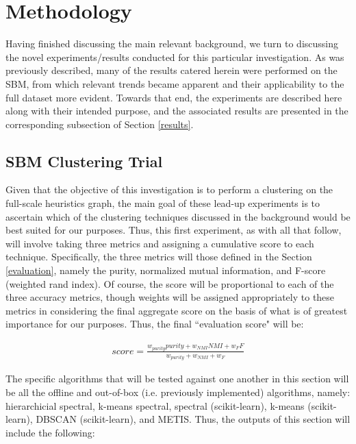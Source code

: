 \documentclass{article}
\begin{document}
\section{Methodology}\label{methodology}
Having finished discussing the main relevant background, we turn to discussing the novel experiments/results conducted for this particular investigation. As was previously described, many of the results catered herein were performed on the SBM, from which relevant trends became apparent and their applicability to the full dataset more evident. Towards that end, the experiments are described here along with their intended purpose, and the associated results are presented in the corresponding subsection of Section \ref{results}.

\subsection{SBM Clustering Trial}
Given that the objective of this investigation is to perform a clustering on the full-scale heuristics graph, the main goal of these lead-up experiments is to ascertain which of the clustering techniques discussed in the background would be best suited for our purposes. Thus, this first experiment, as with all that follow, will involve taking three metrics and assigning a cumulative score to each technique. Specifically, the three metrics will those defined in the Section \ref{evaluation}, namely the purity, normalized mutual information, and F-score (weighted rand index). Of course, the score will be proportional to each of the three accuracy metrics, though weights will be assigned appropriately to these metrics in considering the final aggregate score on the basis of what is of greatest importance for our purposes. Thus, the final ``evaluation score" will be:

\begin{align}
    score = \frac{w_{purity}purity + w_{NMI}NMI + w_{F}F}{w_{purity} + w_{NMI} + w_{F}}
\end{align}

The specific algorithms that will be tested against one another in this section will be all the offline and out-of-box (i.e. previously implemented) algorithms, namely: hierarchicial spectral, k-means spectral, spectral (scikit-learn), k-means (scikit-learn), DBSCAN (scikit-learn), and METIS. Thus, the outputs of this section will include the following:
\end{document}
